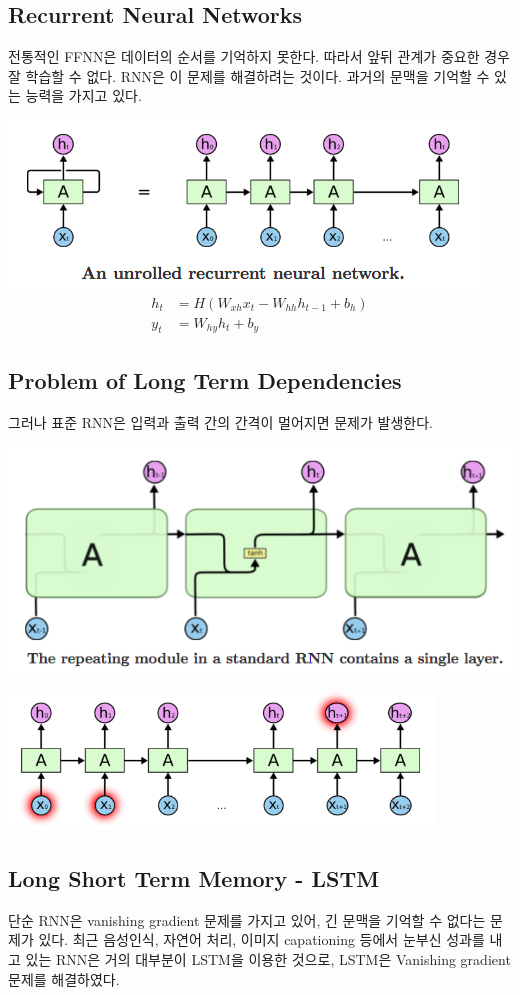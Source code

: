\documentclass[ %
    a4paper,    %
    amsmath,    %
    itemph,     %
11pt]{oblivoir}     %
\begin{document}
\subsection{Recurrent Neural Networks}
전통적인 FFNN은 데이터의 순서를 기억하지 못한다. 따라서 앞뒤 관계가 중요한 경우 잘 학습할 수 없다. RNN은 이 문제를 해결하려는 것이다.  과거의 문맥을 기억할 수 있는 능력을 가지고 있다.

\hfil\includegraphics[width=.7\textwidth]{rnn1.png}\hfil
\begin{align}
h_t &= H(W_{xh}x_t - W_{hh}h_{t-1} + b_h)\\
y_t &= W_{hy}h_t+ b_y
\end{align}

\subsection{Problem of Long Term Dependencies}
그러나 표준 RNN은 입력과 출력 간의 간격이 멀어지면 문제가 발생한다.

\hfil\includegraphics[width=.7\textwidth]{rnn3.png}\hfil

\hfil\includegraphics[width=.7\textwidth]{rnn2.png}\hfil

\subsection{Long Short Term Memory - LSTM}
단순 RNN은 vanishing gradient 문제를 가지고 있어, 긴 문맥을 기억할 수 없다는 문제가 있다. 최근 음성인식, 자연어 처리, 이미지 capationing 등에서 눈부신 성과를 내고 있는 RNN은 거의 대부분이 LSTM을 이용한 것으로, LSTM은 Vanishing gradient 문제를 해결하였다.
\end{document}
